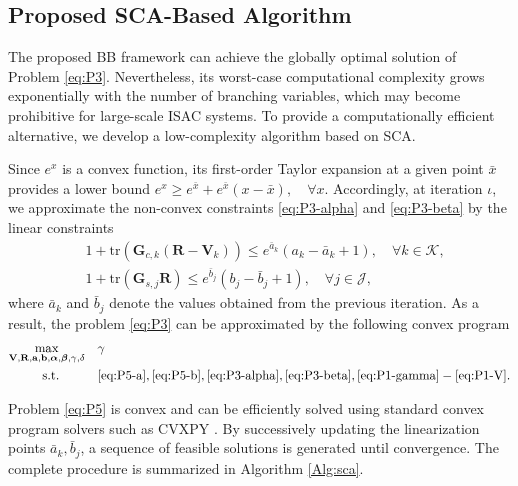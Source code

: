 \documentclass[runningheads]{llncs}
\begin{document}
\subsection{{Proposed SCA-Based Algorithm}}
The proposed BB framework can achieve the globally optimal solution of Problem \eqref{eq:P3}. Nevertheless, its worst-case computational complexity grows exponentially with the number of branching variables, which may become prohibitive for large-scale ISAC systems. To provide a computationally efficient alternative, we develop a low-complexity algorithm based on SCA.

Since $e^x$ is a convex function, its first-order Taylor expansion at a given point $\bar{x}$ provides a lower bound $e^x \ge e^{\bar{x}} + e^{\bar{x}}(x-\bar{x}), \quad \forall x$. Accordingly, at iteration $\iota$, we approximate the non-convex constraints \eqref{eq:P3-alpha} and \eqref{eq:P3-beta} by the linear constraints
\begin{align}
& 1 + \mathrm{tr}(\mathbf{G}_{c,k} (\mathbf{R} - \mathbf{V}_k)) \le e^{\bar{a}_k} (a_k - \bar{a}_k + 1 ), \quad \forall k \in \mathcal{K}, \label{eq:P5-a} \\
& 1 + \mathrm{tr}(\mathbf{G}_{s,j} \mathbf{R}) \le e^{\bar{b}_j} (b_j - \bar{b}_j + 1 ) , \quad \forall j \in \mathcal{J}, \label{eq:P5-b}
\end{align}
where $\bar a_k$ and $\bar b_j$ denote the values obtained from the previous iteration. As a result, the problem \eqref{eq:P3} can be approximated by the following convex program
\begin{subequations}
\label{eq:P5}
\begin{align}
\max_{\mathbf{V}, \mathbf{R}, \mathbf{a}, \mathbf{b}, \boldsymbol{\alpha}, \boldsymbol{\beta}, \gamma, \delta} \quad 
& \gamma \\
\text{s.t.} \quad\quad\quad
& \eqref{eq:P5-a}, \eqref{eq:P5-b} ,  \eqref{eq:P3-alpha}, \eqref{eq:P3-beta}, \eqref{eq:P1-gamma} - \eqref{eq:P1-V}.
\end{align}
\end{subequations}

Problem \eqref{eq:P5} is convex and can be efficiently solved using standard convex program
solvers such as CVXPY \cite{diamond2016cvxpy}. By successively updating the linearization points ${\bar a_k,\bar b_j}$, a sequence of feasible solutions is generated until convergence. The complete procedure is summarized in Algorithm \ref{Alg:sca}.
\end{document}
